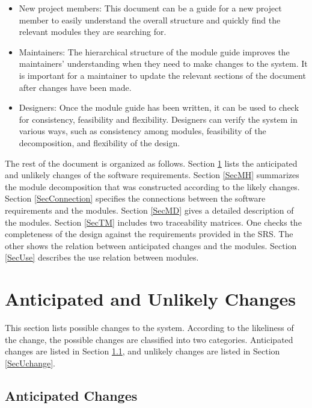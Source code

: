 \documentclass[12pt, titlepage]{article}
\begin{document}
\begin{itemize}
\item New project members: This document can be a guide for a new project member
  to easily understand the overall structure and quickly find the
  relevant modules they are searching for.
\item Maintainers: The hierarchical structure of the module guide improves the
  maintainers' understanding when they need to make changes to the system. It is
  important for a maintainer to update the relevant sections of the document
  after changes have been made.
\item Designers: Once the module guide has been written, it can be used to
  check for consistency, feasibility and flexibility. Designers can verify the
  system in various ways, such as consistency among modules, feasibility of the
  decomposition, and flexibility of the design.
\end{itemize}

The rest of the document is organized as follows. Section
\ref{SecChange} lists the anticipated and unlikely changes of the software
requirements. Section \ref{SecMH} summarizes the module decomposition that
was constructed according to the likely changes. Section \ref{SecConnection}
specifies the connections between the software requirements and the
modules. Section \ref{SecMD} gives a detailed description of the
modules. Section \ref{SecTM} includes two traceability matrices. One checks
the completeness of the design against the requirements provided in the SRS. The
other shows the relation between anticipated changes and the modules. Section
\ref{SecUse} describes the use relation between modules.

\section{Anticipated and Unlikely Changes} \label{SecChange}

This section lists possible changes to the system. According to the likeliness
of the change, the possible changes are classified into two
categories. Anticipated changes are listed in Section \ref{SecAchange}, and
unlikely changes are listed in Section \ref{SecUchange}.

\subsection{Anticipated Changes} \label{SecAchange}
\end{document}
